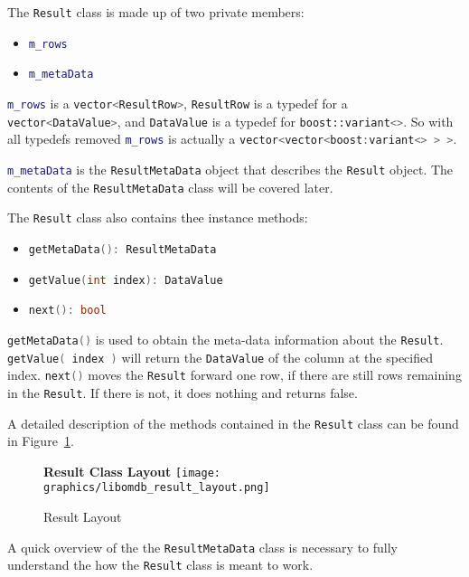 \documentclass[letterpaper, 12pt]{article}
\newcommand{\inlinecode}[1]{\colorbox{codegrey}{\lstinline[language=C++]{#1}}}
\begin{document}
  The \inlinecode{Result} class is made up of two private members:
  \begin{itemize}
    \item \inlinecode{m_rows}
    \item \inlinecode{m_metaData}
  \end{itemize}
  \inlinecode{m_rows} is a \inlinecode{vector<ResultRow>}, \inlinecode{ResultRow} is a typedef for
  a \inlinecode{vector<DataValue>}, and \inlinecode{DataValue} is a typedef for \inlinecode{boost::variant<>}.
  So with all typedefs removed \inlinecode{m_rows} is actually a \inlinecode{vector<vector<boost:variant<> > >}.

  \inlinecode{m_metaData} is the
  \inlinecode{ResultMetaData} object that describes the
  \inlinecode{Result} object. The contents of the
  \inlinecode{ResultMetaData} class will be covered later.
  \par\vspace{\baselineskip}
  The \inlinecode{Result} class also contains thee instance methods:
  \begin{itemize}
    \item \inlinecode{getMetaData(): ResultMetaData}
    \item \inlinecode{getValue(int index): DataValue}
    \item \inlinecode{next(): bool}
  \end{itemize}
  \inlinecode{getMetaData()} is used to obtain the meta-data
  information about the \inlinecode{Result}.
  \inlinecode{getValue( index )} will return the
  \inlinecode{DataValue} of the column at the specified index.
  \inlinecode{next()} moves the
  \inlinecode{Result} forward one row, if there are still rows
  remaining in the \inlinecode{Result}. If there is not, it does
  nothing and returns false.
  \par\vspace{\baselineskip}
  A detailed description of the methods contained in the \inlinecode{Result} class 
  can be found in Figure~\ref{fig:result_methods}.
  \begin{figure}
    \centering
    \label{fig:result_methods}
    \textbf{Result Class Layout}
    \texttt{[image: graphics/libomdb\_result\_layout.png]}
    \caption{Result Layout}
  \end{figure}
  \par\vspace{\baselineskip}
  A quick overview of the the \inlinecode{ResultMetaData} class
  is necessary to fully understand the how the
  \inlinecode{Result} class is meant to work.
\end{document}
